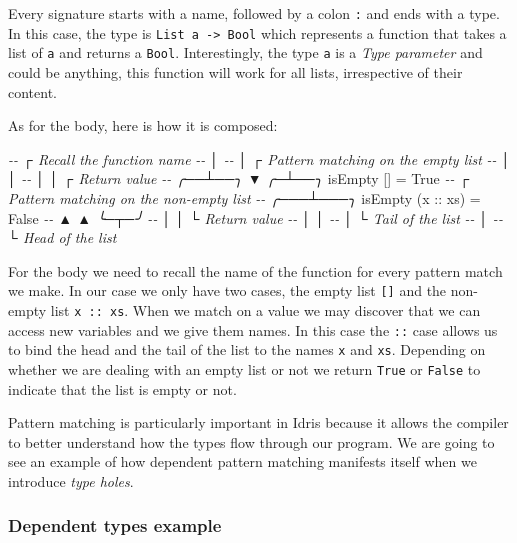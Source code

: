 \documentclass[
]{article}
\newenvironment{Shaded}{}{}
\newcommand{\CommentTok}[1]{\textcolor[rgb]{0.38,0.63,0.69}{\textit{#1}}}
\newcommand{\DataTypeTok}[1]{\textcolor[rgb]{0.56,0.13,0.00}{#1}}
\newcommand{\NormalTok}[1]{#1}
\newcommand{\OtherTok}[1]{\textcolor[rgb]{0.00,0.44,0.13}{#1}}
\begin{document}
Every signature starts with a name, followed by a colon \texttt{:} and
ends with a type. In this case, the type is
\texttt{List\ a\ -\textgreater{}\ Bool} which represents a function that
takes a list of \texttt{a} and returns a \texttt{Bool}. Interestingly,
the type \texttt{a} is a \emph{Type parameter} and could be anything,
this function will work for all lists, irrespective of their content.

As for the body, here is how it is composed:

\begin{Shaded}
\begin{Highlighting}[]
\CommentTok{{-}{-}    ┌ Recall the function name}
\CommentTok{{-}{-}    │   }
\CommentTok{{-}{-}    │     ┌ Pattern matching on the empty list}
\CommentTok{{-}{-}    │     │   }
\CommentTok{{-}{-}    │     │    ┌ Return value}
\CommentTok{{-}{-} ╭──┴──╮  ▼  ╭─┴──╮}
\NormalTok{   isEmpty [] }\OtherTok{=} \DataTypeTok{True}
\CommentTok{{-}{-}             ┌ Pattern matching on the non{-}empty list}
\CommentTok{{-}{-}         ╭───┴───╮}
\NormalTok{   isEmpty (}\OtherTok{x ::}\NormalTok{ xs) }\OtherTok{=} \DataTypeTok{False}
\CommentTok{{-}{-}          ▲    ▲     ╰─┬─╯}
\CommentTok{{-}{-}          │    │       └ Return value}
\CommentTok{{-}{-}          │    │}
\CommentTok{{-}{-}          │    └ Tail of the list}
\CommentTok{{-}{-}          │}
\CommentTok{{-}{-}          └ Head of the list}
\end{Highlighting}
\end{Shaded}

For the body we need to recall the name of the function for every
pattern match we make. In our case we only have two cases, the empty
list \texttt{{[}{]}} and the non-empty list \texttt{x\ ::\ xs}. When we
match on a value we may discover that we can access new variables and we
give them names. In this case the \texttt{::} case allows us to bind the
head and the tail of the list to the names \texttt{x} and \texttt{xs}.
Depending on whether we are dealing with an empty list or not we return
\texttt{True} or \texttt{False} to indicate that the list is empty or
not.

Pattern matching is particularly important in Idris because it allows
the compiler to better understand how the types flow through our
program. We are going to see an example of how dependent pattern
matching manifests itself when we introduce \emph{type holes}.

\hypertarget{dependent-types-example}{%
\subsubsection{Dependent types example}\label{dependent-types-example}}
\end{document}
